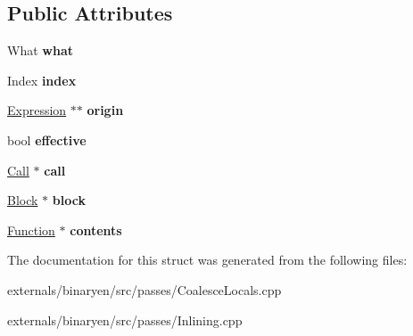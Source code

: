 \subsection*{Public Attributes}
\begin{DoxyCompactItemize}
\item 
\mbox{\label{structwasm_1_1_action_affe201b736d595cc3764b6466f679f4f}} 
What {\bfseries what}
\item 
\mbox{\label{structwasm_1_1_action_acb38476da7102e819e29ca1d752a1b3d}} 
Index {\bfseries index}
\item 
\mbox{\label{structwasm_1_1_action_a077ecbff00c4a823185670606704bf71}} 
\mbox{\hyperlink{classwasm_1_1_expression}{Expression}} $\ast$$\ast$ {\bfseries origin}
\item 
\mbox{\label{structwasm_1_1_action_a90ff5e439a5d0483d8eba148a370ef3f}} 
bool {\bfseries effective}
\item 
\mbox{\label{structwasm_1_1_action_a63747c48aea7dca8f5f03c44e6caacac}} 
\mbox{\hyperlink{classwasm_1_1_call}{Call}} $\ast$ {\bfseries call}
\item 
\mbox{\label{structwasm_1_1_action_aa77c95ee3a33a9439bf57489e9cd5e4c}} 
\mbox{\hyperlink{classwasm_1_1_block}{Block}} $\ast$ {\bfseries block}
\item 
\mbox{\label{structwasm_1_1_action_a2a48e8581af7f15d91c238b26c8f592c}} 
\mbox{\hyperlink{classwasm_1_1_function}{Function}} $\ast$ {\bfseries contents}
\end{DoxyCompactItemize}


The documentation for this struct was generated from the following files\+:\begin{DoxyCompactItemize}
\item 
externals/binaryen/src/passes/Coalesce\+Locals.\+cpp\item 
externals/binaryen/src/passes/Inlining.\+cpp\end{DoxyCompactItemize}
